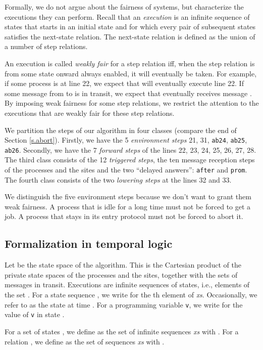 \documentclass[10pt]{article} \usepackage[english]{babel}
\def\S #1/{\mbox {\textsl{#1}}}
\def\T #1/{\mbox {\texttt{#1}}}
\begin{document}
Formally, we do not argue about the fairness of systems, but
characterize the executions they can perform. Recall that an
\emph{execution} is an infinite sequence of states that starts in an
initial state and for which every pair of subsequent states satisfies
the next-state relation.  The next-state relation is defined as the
union of a number of step relations.  

An execution is called \emph{weakly fair} for a step relation iff,
when the step relation is from some state onward always enabled,
it will eventually be taken.  For example, if some process  is at
line 22, we expect that  will eventually execute line 22.  If some
message  from  to  is in transit, we expect that 
eventually receives message .  By imposing weak fairness for some
step relations, we restrict the attention to the executions that are
weakly fair for these step relations.

We partition the steps of our algorithm in four classes (compare the
end of Section \ref{s.abort}).  Firstly, we have the 5
\emph{environment steps} 21, 31, \T ab24/, \T ab25/, \T
ab26/. Secondly, we have the 7 \emph{forward steps} of the lines 22,
23, 24, 25, 26, 27, 28. The third class consists of the 12
\emph{triggered steps}, the ten message reception steps of the
processes and the sites and the two ``delayed answers'': \T after/ and
\T prom/.  The fourth class consists of the two \emph{lowering
  steps} at the lines 32 and 33.

We distinguish the five environment steps because we don't want to
grant them weak fairness.  A process that is idle for a long time must
not be forced to get a job.  A process that stays in its entry
protocol must not be forced to abort it.

\subsection{Formalization in temporal logic} \label{execform}

Let  be the state space of the algorithm.  This is the Cartesian
product of the private state spaces of the processes and the sites,
together with the sets of messages in transit.  Executions are
infinite sequences of states, i.e., elements of the set .
For a state sequence , we write  for
the th element of \S xs/.  Occasionally, we refer to  as
the state at time . For a programming variable \T v/, we write  for the value of \T v/ in state .

For a set of states , we define  as the set of infinite sequences \S xs/ with . For a relation , we define  as the set of sequences \S xs/ with .
\end{document}
